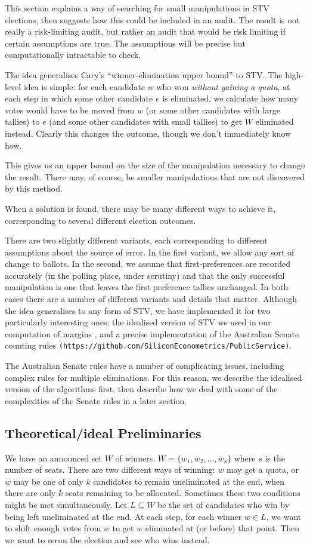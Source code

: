 \documentclass[10pt,a4paper]{article}
\begin{document}
This section explains a way of searching for small manipulations in STV elections, then suggests how this could be included in an audit.  The result is not really a risk-limiting audit, but rather an audit that would be risk limiting if certain assumptions are true.  The assumptions will be precise but computationally intractable to check. 

The idea generalises Cary's ``winner-elimination upper bound'' to STV.  The high-level idea is simple: for each candidate $w$ who won \emph{without gaining a quota}, at each step in which some other candidate $e$ is eliminated, we calculate how many votes would have to be moved from $w$ (or some other candidates with large tallies) to $e$ (and some other candidates with small tallies) to get $W$ eliminated instead.   Clearly this changes the outcome, though we don't immediately know how.

This gives us an upper bound on the size of the manipulation necessary to change the result.  There may, of course, be smaller manipulations that are not discovered by this method.  

When a solution is found, there may be many different ways to achieve it, corresponding to several different election outcomes.  

There are two slightly different variants, each corresponding to different assumptions about the source of error.  In the first variant, we allow any sort of change to ballots.  In the second, we assume that first-preferences are recorded accurately (in the polling place, under scrutiny) and that the only successful manipulation is one that leaves the first preference tallies unchanged.  In both cases there are a number of different variants and details that matter.  Although the idea generalises to any form of STV, we have implemented it for two particularly interesting ones: the idealised version of STV we used in our computation of margins \cite{blom2015efficient}, and a precise implementation of the Australian Senate counting rules \verb|(https://github.com/SiliconEconometrics/PublicService)|.

The Australian Senate rules have a number of complicating issues, including complex rules for multiple eliminations.  For this reason, we describe the idealised version of the algorithms first, then describe how we deal with some of the complexities of the Senate rules in a later section.

\subsection{Theoretical/ideal Preliminaries}
We have an announced set $W$ of winners.  $W = \{w_1, w_2, \ldots, w_s \}$ where $s$ is the number of seats.  There are two different ways of winning: $w$ may get a quota, or $w$ may be one of only $k$ candidates to remain uneliminated at the end, when there are only $k$ seats remaining to be allocated.  Sometimes these two conditions might be met simultaneously.  Let $L \subseteq W$ be the set of candidates who win by being left uneliminated at the end.  At each step, for each winner $w \in L$, we want to shift enough votes from $w$ to get $w$ eliminated at (or before) that point.  Then we want to rerun the election and see who wins instead.
\end{document}
